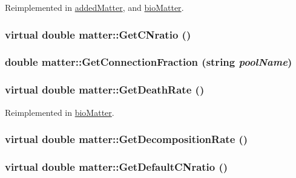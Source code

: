 Reimplemented in \hyperlink{classadded_matter_ac2d053d776783effa120e93de55c41ea}{addedMatter}, and \hyperlink{classbio_matter_ac8e514d722c9605efcf653fdc46b1d65}{bioMatter}.\hypertarget{classmatter_a1c97017b5f16dd256b99961f8b50a946}{
\subsubsection[{GetCNratio}]{\setlength{\rightskip}{0pt plus 5cm}virtual double matter::GetCNratio ()}}
\label{classmatter_a1c97017b5f16dd256b99961f8b50a946}
\hypertarget{classmatter_a97573040212b5ac7047a2cba344346d1}{
\subsubsection[{GetConnectionFraction}]{\setlength{\rightskip}{0pt plus 5cm}double matter::GetConnectionFraction (string {\em poolName})}}
\label{classmatter_a97573040212b5ac7047a2cba344346d1}
\hypertarget{classmatter_a3abae42a1209403e4c6b31521cb4a847}{
\subsubsection[{GetDeathRate}]{\setlength{\rightskip}{0pt plus 5cm}virtual double matter::GetDeathRate ()}}
\label{classmatter_a3abae42a1209403e4c6b31521cb4a847}


Reimplemented in \hyperlink{classbio_matter_a78a7ead491fa0a5b799e672309dfca3e}{bioMatter}.\hypertarget{classmatter_abf19fbb793ab04234294f9afca07a337}{
\subsubsection[{GetDecompositionRate}]{\setlength{\rightskip}{0pt plus 5cm}virtual double matter::GetDecompositionRate ()}}
\label{classmatter_abf19fbb793ab04234294f9afca07a337}
\hypertarget{classmatter_a96b0fe568fcecda260abc0a5d32ca3da}{
\subsubsection[{GetDefaultCNratio}]{\setlength{\rightskip}{0pt plus 5cm}virtual double matter::GetDefaultCNratio ()}}
\label{classmatter_a96b0fe568fcecda260abc0a5d32ca3da}



